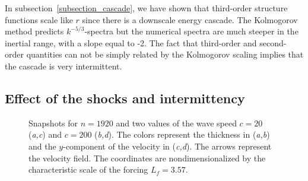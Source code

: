 


In subsection~\ref{subsection_cascade}, we have shown that third-order
structure functions scale like $r$ since there is a downscale energy
cascade.
%
The Kolmogorov method predicts $k^{-5/3}$-spectra but the numerical
spectra are much steeper in the inertial range, with a slope equal to
-2.  The fact that third-order and second-order quantities can not be
simply related by the Kolmogorov scaling implies that the cascade is
very intermittent.




\subsection{Effect of the shocks and intermittency}




\begin{figure}
\setlength{\halfwidth}{2.72in}
\caption{
Snapshots for $n = 1920$ and two values of the wave speed 
$c= 20$ (\textit{a,c}) and $c= 200$ (\textit{b,d}).
The colors represent the thickness in (\textit{a,b}) and
the $y$-component of the velocity in (\textit{c,d}).
The arrows represent the velocity field.
%
The coordinates are nondimensionalized by the characteristic scale of
the forcing $L_f = 3.57$.  }
\label{fig_phys}
\end{figure}

